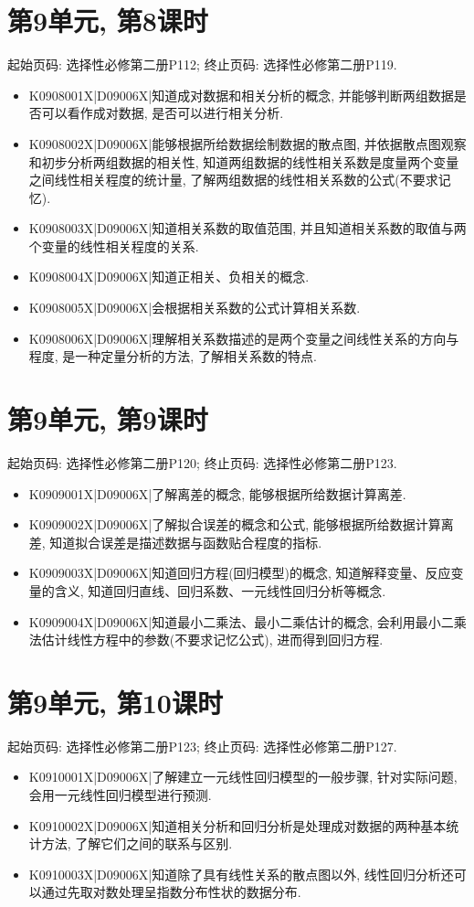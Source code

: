 \section*{第9单元, 第8课时}
起始页码: 选择性必修第二册P112; 终止页码: 选择性必修第二册P119.
\begin{itemize}
\item K0908001X|D09006X|知道成对数据和相关分析的概念, 并能够判断两组数据是否可以看作成对数据, 是否可以进行相关分析.
\item K0908002X|D09006X|能够根据所给数据绘制数据的散点图, 并依据散点图观察和初步分析两组数据的相关性, 知道两组数据的线性相关系数是度量两个变量之间线性相关程度的统计量, 了解两组数据的线性相关系数的公式(不要求记忆).
\item K0908003X|D09006X|知道相关系数的取值范围, 并且知道相关系数的取值与两个变量的线性相关程度的关系.
\item K0908004X|D09006X|知道正相关、负相关的概念.
\item K0908005X|D09006X|会根据相关系数的公式计算相关系数.
\item K0908006X|D09006X|理解相关系数描述的是两个变量之间线性关系的方向与程度, 是一种定量分析的方法, 了解相关系数的特点.
\end{itemize}

\section*{第9单元, 第9课时}
起始页码: 选择性必修第二册P120; 终止页码: 选择性必修第二册P123.
\begin{itemize}
\item K0909001X|D09006X|了解离差的概念, 能够根据所给数据计算离差.
\item K0909002X|D09006X|了解拟合误差的概念和公式, 能够根据所给数据计算离差, 知道拟合误差是描述数据与函数贴合程度的指标.
\item K0909003X|D09006X|知道回归方程(回归模型)的概念, 知道解释变量、反应变量的含义, 知道回归直线、回归系数、一元线性回归分析等概念.
\item K0909004X|D09006X|知道最小二乘法、最小二乘估计的概念, 会利用最小二乘法估计线性方程中的参数(不要求记忆公式), 进而得到回归方程.
\end{itemize}

\section*{第9单元, 第10课时}
起始页码: 选择性必修第二册P123; 终止页码: 选择性必修第二册P127.
\begin{itemize}
\item K0910001X|D09006X|了解建立一元线性回归模型的一般步骤, 针对实际问题, 会用一元线性回归模型进行预测.
\item K0910002X|D09006X|知道相关分析和回归分析是处理成对数据的两种基本统计方法, 了解它们之间的联系与区别.
\item K0910003X|D09006X|知道除了具有线性关系的散点图以外, 线性回归分析还可以通过先取对数处理呈指数分布性状的数据分布.
\end{itemize}

